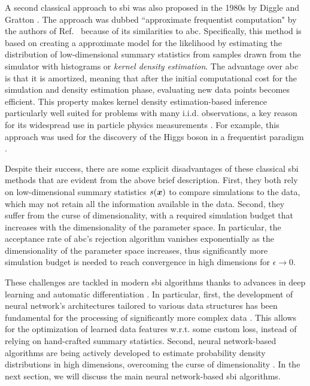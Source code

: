 A second classical approach to \gls*{sbi} was also proposed in the 1980s by Diggle and Gratton \cite{diggle1984monte}. The approach was dubbed ``approximate frequentist computation" by the authors of Ref.~\cite{brehmer2018guide} because of its similarities to \gls*{abc}. Specifically, this method is based on creating a approximate model for the likelihood by estimating the distribution of low-dimensional summary statistics from samples drawn from the simulator with histograms or \emph{kernel density estimation}. The advantage over \gls*{abc} is that it is amortized, meaning that after the initial computational cost for the simulation and density estimation phase, evaluating new data points becomes efficient.
This property makes kernel density estimation-based inference particularly well suited for problems with many i.i.d. observations, a key reason for its widespread use in particle physics measurements \cite{Brehmer:2020cvb}. For example, this approach was used for the discovery of the Higgs boson in a frequentist paradigm \cite{brehmer2018guide}. 

Despite their success, there are some explicit disadvantages of these classical \gls*{sbi} methods that are evident from the above brief description. First, they both rely on low-dimensional summary statistics $s(\bm{x})$ to compare simulations to the data, which may not retain all the information available in the data. Second, they suffer from the curse of dimensionality, with a required simulation budget that increases with the dimensionality of the parameter space. In particular, the acceptance rate of \gls*{abc}'s rejection algorithm vanishes exponentially as the dimensionality of the parameter space increases, thus significantly more simulation budget is needed to reach convergence in high dimensions for $\epsilon \to 0$.

These challenges are tackled in modern \gls*{sbi} algorithms thanks to advances in deep learning \cite{lecun2015deep} and automatic differentiation \cite{baydin2018automatic}. In particular, first, the development of neural network's architectures tailored to various data structures has been fundamental for the processing of significantly more complex data  \cite{lecun2015deep}. This allows for the optimization of learned data features w.r.t. some custom loss, instead of relying on hand-crafted summary statistics. Second, neural network-based algorithms are being actively developed to estimate probability density distributions in high dimensions, overcoming the curse of dimensionality \cite[\eg][]{papamakarios2019neural, papamakarios2021normalizing, Papamakarios:2016ctj}. In the next section, we will discuss the main neural network-based \gls*{sbi} algorithms. 


